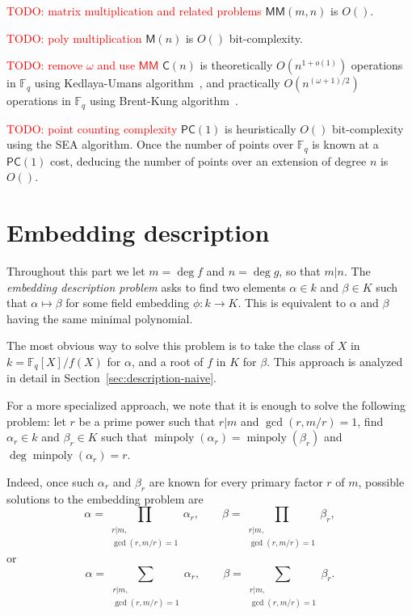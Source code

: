 \documentclass[12pt]{article}
\theoremstyle{plain}
\theoremstyle{definition}
\newcommand{\todo}[1]{\textcolor{red}{TODO: #1}}
\DeclareMathOperator{\minpoly}{minpoly}
\def\F{\ensuremath{\mathbb{F}}}
\def\MM{\ensuremath{\mathsf{M}}}
\def\MMM{\ensuremath{\mathsf{MM}}}
\def\MC{\ensuremath{\mathsf{C}}}
\def\PC{\ensuremath{\mathsf{PC}}}
\newcounter{algorithm}
\begin{document}
\todo{matrix multiplication and related problems}
$\MMM(m, n)$ is $O()$.

\todo{poly multiplication}
$\MM(n)$ is $O()$ bit-complexity.

\todo{remove $\omega$ and use $\MMM$}
$\MC(n)$ is theoretically $O(n^{1 + o(1)})$ operations in $\F_q$
using Kedlaya-Umans algorithm~\cite{kedlaya+umans08},
and practically
$O(n^{(\omega + 1)/2})$ operations in $\F_q$
using Brent-Kung algorithm~\cite{brent+kung}.

\todo{point counting complexity}
$\PC(1)$ is heuristically $O()$ bit-complexity
using the SEA algorithm.
Once the number of points over $\F_q$ is known at a $\PC(1)$ cost,
deducing the number of points over an extension of degree $n$ is
$O()$.



\part{Embedding description}

Throughout this part we let $m=\deg f$ and $n=\deg g$, so that
$m|n$. The \emph{embedding description problem} asks to find two
elements $\alpha\in k$ and $\beta\in K$ such that $\alpha\mapsto\beta$
for some field embedding $\phi:k\to K$. This is equivalent to
$\alpha$ and $\beta$ having the same minimal polynomial.

The most obvious way to solve this problem is to take the class of $X$
in $k=\F_q[X]/f(X)$ for $\alpha$, and a root of $f$ in $K$ for
$\beta$. This approach is analyzed in detail in
Section~\ref{sec:description-naive}.

For a more specialized approach, we note that it is enough to solve
the following problem: let $r$ be a prime power such that $r|m$ and
$\gcd(r,m/r)=1$, find $\alpha_r\in k$ and $\beta_r\in K$ such that
$\minpoly(\alpha_r)=\minpoly(\beta_r)$ and $\deg\minpoly(\alpha_r)=r$.

Indeed, once such $\alpha_r$ and $\beta_r$ are known for every primary
factor $r$ of $m$, possible solutions to the embedding problem are
\begin{equation*}
  \alpha = \prod_{\substack{r|m,\\\gcd(r,m/r)=1}}\alpha_r,\qquad
  \beta = \prod_{\substack{r|m,\\\gcd(r,m/r)=1}}\beta_r,
\end{equation*}
or
\begin{equation*}
  \alpha = \sum_{\substack{r|m,\\\gcd(r,m/r)=1}}\alpha_r,\qquad
  \beta = \sum_{\substack{r|m,\\\gcd(r,m/r)=1}}\beta_r.
\end{equation*}
\end{document}
